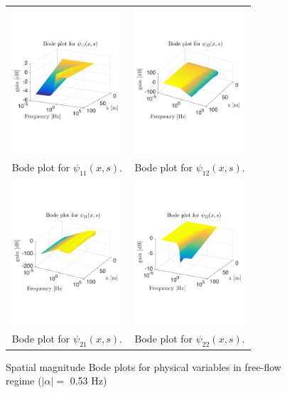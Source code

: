 \documentclass[5p,twocolumn]{elsarticle}
\begin{document}
\begin{figure}
\centering
\begin{tabular}{cc}
\includegraphics[trim = 0mm 60mm 0mm 60mm, width = 4.2cm]{distr_psi_11}
&
\includegraphics[trim = 0mm 60mm 0mm 60mm, width = 4.2cm]{distr_psi_12}
\tabularnewline
Bode plot for $\psi_{11}(x,s)$.
&
Bode plot for $\psi_{12}(x,s)$.
\tabularnewline
\includegraphics[trim = 0mm 60mm 0mm 60mm, width = 4.2cm]{distr_psi_21}
&
\includegraphics[trim = 0mm 60mm 0mm 60mm, width = 4.2cm]{distr_psi_22}
\tabularnewline
Bode plot for $\psi_{21}(x,s)$.
&
Bode plot for $\psi_{22}(x,s)$.
\tabularnewline
\end{tabular}
\caption{Spatial magnitude Bode plots for physical variables in free-flow regime ($\left|\alpha\right| = $ 0.53 Hz)\label{fig:Magn_spatial_physx}}
\end{figure}
\end{document}
